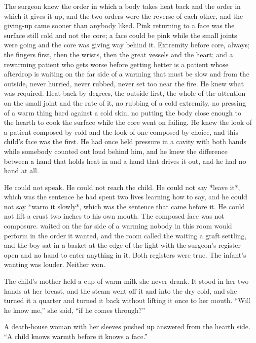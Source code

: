 The surgeon knew the order in which a body takes heat back and the order in which it gives it up, and the two orders were the reverse of each other, and the giving-up came sooner than anybody liked. Pink returning to a face was the surface still cold and not the core; a face could be pink while the small joints were going and the core was giving way behind it. Extremity before core, always; the fingers first, then the wrists, then the great vessels and the heart; and a rewarming patient who gets worse before getting better is a patient whose afterdrop is waiting on the far side of a warming that must be slow and from the outside, never hurried, never rubbed, never set too near the fire. He knew what was required. Heat back by degrees, the outside first, the whole of the attention on the small joint and the rate of it, no rubbing of a cold extremity, no pressing of a warm thing hard against a cold skin, no putting the body close enough to the hearth to cook the surface while the core went on failing. He knew the look of a patient composed by cold and the look of one composed by choice, and this child's face was the first. He had once held pressure in a cavity with both hands while somebody counted out loud behind him, and he knew the difference between a hand that holds heat in and a hand that drives it out, and he had no hand at all.

He could not speak. He could not reach the child. He could not say *leave it*, which was the sentence he had spent two lives learning how to say, and he could not say *warm it slowly*, which was the sentence that came before it. He could not lift a crust two inches to his own mouth. The composed face was not composure.  waited on the far side of a warming nobody in this room would perform in the order it wanted, and the room called the waiting a graft settling, and the boy sat in a basket at the edge of the light with the surgeon's register open and no hand to enter anything in it. Both registers were true. The infant's wanting was louder. Neither won.

\scenebreak

The child's mother held a cup of warm milk she never drank. It stood in her two hands at her breast, and the steam went off it and into the dry cold, and she turned it a quarter and turned it back without lifting it once to her mouth. “Will he know me,” she said, “if he comes through?”

A death-house woman with her sleeves pushed up answered from the hearth side. “A child knows warmth before it knows a face.”

